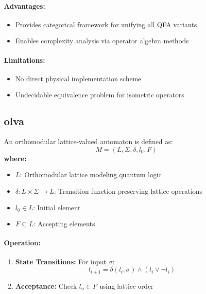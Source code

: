 \paragraph{Advantages:}
\begin{itemize}
    \item Provides categorical framework for unifying all QFA variants
    \item Enables complexity analysis via operator algebra methods
\end{itemize}

\paragraph{Limitations:}
\begin{itemize}
    \item No direct physical implementation scheme
    \item Undecidable equivalence problem for isometric operators
\end{itemize}

\subsection{\acrfull{olva}}
\label{subsec:olva}

\begin{definition}
An orthomodular lattice-valued automaton is defined as:
\[
M = (L, \Sigma, \delta, l_0, F)
\]
\textbf{where:}
\begin{itemize}
    \item $L$: Orthomodular lattice modeling quantum logic
    \item $\delta: L \times \Sigma \rightarrow L$: Transition function preserving lattice operations
    \item $l_0 \in L$: Initial element
    \item $F \subseteq L$: Accepting elements
\end{itemize}
\end{definition}

\paragraph{Operation:}
\begin{enumerate}
    \item \textbf{State Transitions:} For input $\sigma$:
    \[
    l_{i+1} = \delta(l_i, \sigma) \land (l_i \lor \neg l_i)
    \]
    \item \textbf{Acceptance:} Check $l_n \in F$ using lattice order
\end{enumerate}

